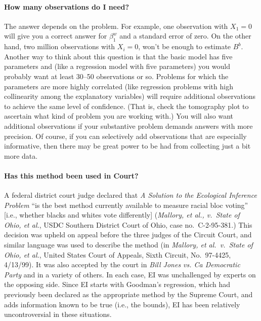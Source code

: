 \documentclass[11pt,titlepage]{article}
\begin{document}
\paragraph{How many observations do I need?}  The answer
depends on the problem.  For example, one observation with $X_1=0$
will give you a correct answer for $\beta_1^w$ and a standard error of
zero.  On the other hand, two million observations with $X_i=0$, won't
be enough to estimate $B^b$.  Another way to think about this question
is that the basic model has five parameters and (like a regression
model with five parameters) you would probably want at least 30--50
observations or so.  Problems for which the parameters are more highly
correlated (like regression problems with high collinearity among the
explanatory variables) will require additional observations to achieve
the same level of confidence.  (That is, check the tomography plot to
ascertain what kind of problem you are working with.)  You will also
want additional observations if your substantive problem demands
answers with more precision.  Of course, if you can selectively add
observations that are especially informative, then there may be great
power to be had from collecting just a bit more data.

\paragraph{Has this method been used in Court?}
A federal district court judge declared that \emph{A Solution to the
  Ecological Inference Problem} ``is the best method currently
available to measure racial bloc voting'' [i.e., whether blacks and
whites vote differently]
(\emph{Mallory, et al., v.\ State of Ohio, et al.}, USDC Southern
District Court of Ohio, case no.\ C-2-95-381.)  This decision was
upheld on appeal before the three judges of the Circuit Court, and
similar language was used to describe the method (in \emph{Mallory, et
  al.\ v.\ State of Ohio, et al.}, United States Court of Appeals,
Sixth Circuit, No.\ 97-4425, 4/13/99).  It was also accepted by the
court in \emph{Bill Jones vs.  Ca Democratic Party} and in a variety
of others.  In each case, EI was unchallenged by experts on the
opposing side.  Since EI starts with Goodman's regression, which had
previously been declared as the appropriate method by the Supreme
Court, and adds information known to be true (i.e., the bounds), EI
has been relatively uncontroversial in these situations.
\end{document}
